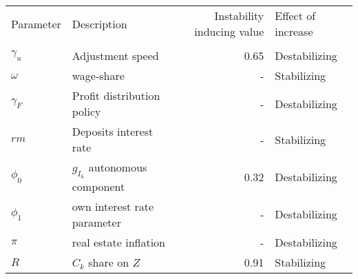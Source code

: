 \begin{table}
\centering
\label{tab:sensibility}
\begin{tabular}{llrl}
\toprule
Parameter &                     Description &  Instability inducing value & Effect of increase \\
           &                                 &                             &                    \\
\midrule
$\gamma_u$ &                Adjustment speed &                        0.65 &      Destabilizing \\
$\omega$   &                      wage-share &                           - &        Stabilizing \\
$\gamma_F$ &      Profit distribution policy &                           - &      Destabilizing \\
$rm$       &          Deposits interest rate &                           - &        Stabilizing \\
$\phi_0$   &  $g_{I_h}$ autonomous component &                        0.32 &      Destabilizing \\
$\phi_1$   &     own interest rate parameter &                           - &      Destabilizing \\
$\pi$      &           real estate inflation &                           - &      Destabilizing \\
$R$        &              $C_k$ share on $Z$ &                        0.91 &        Stabilizing \\
\bottomrule
\end{tabular}
\end{table}
